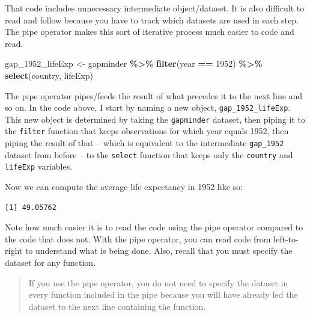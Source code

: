 \documentclass[
]{book}
\makeatletter
\newenvironment{Shaded}{\begin{snugshade}}{\end{snugshade}}
\newcommand{\DecValTok}[1]{\textcolor[rgb]{0.06,0.06,0.06}{#1}}
\newcommand{\FunctionTok}[1]{\textcolor[rgb]{0.27,0.27,0.27}{\textbf{#1}}}
\newcommand{\NormalTok}[1]{#1}
\newcommand{\OtherTok}[1]{\textcolor[rgb]{0.37,0.37,0.37}{#1}}
\newcommand{\SpecialCharTok}[1]{\textcolor[rgb]{0.43,0.43,0.43}{\textbf{#1}}}
\newenvironment{kframe}{%
\medskip{}
\setlength{\fboxsep}{.8em}
 \def\at@end@of@kframe{}%
 \ifinner\ifhmode%
  \def\at@end@of@kframe{\end{minipage}}%
  \begin{minipage}{\columnwidth}%
 \fi\fi%
 \def\FrameCommand##1{\hskip\@totalleftmargin \hskip-\fboxsep
 \colorbox{shadecolor}{##1}\hskip-\fboxsep
     \hskip-\linewidth \hskip-\@totalleftmargin \hskip\columnwidth}%
 \MakeFramed {\advance\hsize-\width
   \@totalleftmargin\z@ \linewidth\hsize
   \@setminipage}}%
 {\par\unskip\endMakeFramed%
 \at@end@of@kframe}
\renewenvironment{Shaded}{\begin{kframe}}{\end{kframe}}
\makeatother
\begin{document}
That code includes unnecessary intermediate object/dataset. It is also difficult to read and follow because you have to track which datasets are used in each step. The pipe operator makes this sort of iterative process much easier to code and read.

\begin{Shaded}
\begin{Highlighting}[]
\NormalTok{gap\_1952\_lifeExp }\OtherTok{\textless{}{-}}\NormalTok{ gapminder }\SpecialCharTok{\%\textgreater{}\%} 
  \FunctionTok{filter}\NormalTok{(year }\SpecialCharTok{==} \DecValTok{1952}\NormalTok{) }\SpecialCharTok{\%\textgreater{}\%} 
  \FunctionTok{select}\NormalTok{(country, lifeExp)}
\end{Highlighting}
\end{Shaded}

The pipe operator pipes/feeds the result of what precedes it to the next line and so on. In the code above, I start by naming a new object, \texttt{gap\_1952\_lifeExp}. This new object is determined by taking the \texttt{gapminder} dataset, then piping it to the \texttt{filter} function that keeps observations for which year equals 1952, then piping the result of that -- which is equivalent to the intermediate \texttt{gap\_1952} dataset from before -- to the \texttt{select} function that keeps only the \texttt{country} and \texttt{lifeExp} variables.

Now we can compute the average life expectancy in 1952 like so:

\begin{Shaded}
\end{Shaded}

\begin{verbatim}
[1] 49.05762
\end{verbatim}

Note how much easier it is to read the code using the pipe operator compared to the code that does not. With the pipe operator, you can read code from left-to-right to understand what is being done. Also, recall that you must specify the dataset for any function.

\begin{quote}
If you use the pipe operator, you do not need to specify the dataset in every function included in the pipe because you will have already fed the dataset to the next line containing the function.
\end{quote}
\end{document}
